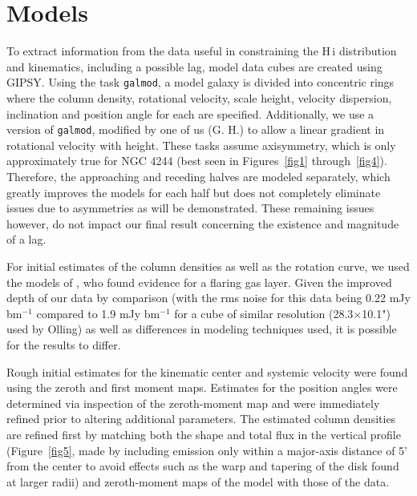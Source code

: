 \documentclass{emulateapj}
\begin{document}
\section{Models} \label{Section4}

\par
    To extract information from the data useful in constraining the {\sc H\,i} distribution and kinematics, including a possible lag, model data cubes are created using GIPSY.  Using the task {\tt galmod}, a model galaxy is divided into concentric rings where the column density, rotational velocity, scale height, velocity dispersion, inclination and position angle for each are specified.  Additionally, we use a version of {\tt galmod}, modified by one of us (G. H.) to allow a linear gradient in rotational velocity with height. These tasks assume axisymmetry, which is only approximately true for NGC 4244 (best seen in Figures~\ref{fig1} through~\ref{fig4}). Therefore, the approaching and receding halves are modeled separately, which greatly improves the models for each half but does not completely eliminate issues due to asymmetries as will be demonstrated. These remaining issues however, do not impact our final result concerning the existence and magnitude of a lag.
     
\par
     For initial estimates of the column densities as well as the rotation curve, we used the models of \citet{1996AJ....112..457O}, who found evidence for a flaring gas layer.  Given the improved depth of our data by comparison (with the rms noise for this data being 0.22 mJy bm$^{-1}$ compared to 1.9 mJy bm$^{-1}$ for a cube of similar resolution (28.3$\times$10.1") used by Olling) as well as differences in modeling techniques used, it is possible for the results to differ.  

\par
     Rough initial estimates for the kinematic center and systemic velocity were found using the zeroth and first moment maps.  Estimates for the position angles were determined via inspection of the zeroth-moment map and were immediately refined prior to altering additional parameters.  The estimated column densities are refined first by matching both the shape and total flux in the vertical profile (Figure~\ref{fig5}, made by including emission only within a major-axis distance of 5' from the center to avoid effects such as the warp and tapering of the disk found at larger radii) and zeroth-moment maps of the model with those of the data.
\end{document}

